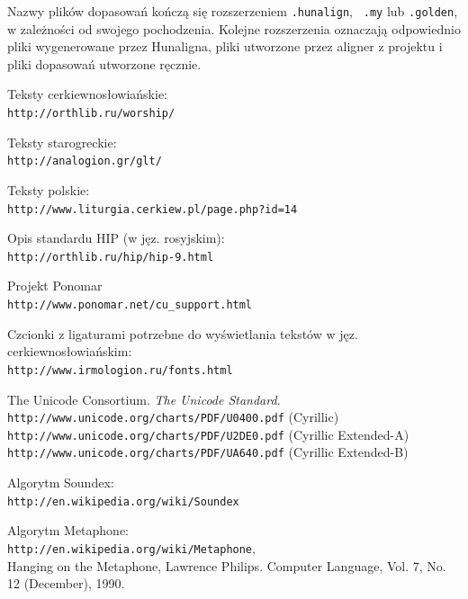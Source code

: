 \documentclass{pracamgr}
\begin{document}
Nazwy plików dopasowań kończą się rozszerzeniem {\tt .hunalign}, {\tt
  .my} lub {\tt .golden}, w zależności od swojego pochodzenia. Kolejne
rozszerzenia oznaczają odpowiednio pliki wygenerowane przez Hunaligna,
pliki utworzone przez aligner z projektu i pliki dopasowań utworzone
ręcznie.


\begin{thebibliography}{99}

 Teksty cerkiewno\-{}słowiańskie:\\
  {\tt http://orthlib.ru/worship/}

 Teksty starogreckie:\\
  {\tt http://analogion.gr/glt/}

 Teksty polskie:\\
  {\tt http://www.liturgia.cerkiew.pl/page.php?id=14}

 Opis standardu HIP (w jęz. rosyjskim):\\
  {\tt http://orthlib.ru/hip/hip-9.html}

 Projekt Ponomar \\
  {\tt http://www.ponomar.net/cu\_support.html}

 Czcionki z ligaturami potrzebne do wyświetlania
  tekstów w jęz. cerkiewno\-{}słowiańskim:\\
  {\tt http://www.irmologion.ru/fonts.html}

  The Unicode Consortium. \textit{The Unicode Standard}.\\
  {\tt http://www.unicode.org/charts/PDF/U0400.pdf} (Cyrillic)\\
  {\tt http://www.unicode.org/charts/PDF/U2DE0.pdf} (Cyrillic Extended-A)\\
  {\tt http://www.unicode.org/charts/PDF/UA640.pdf} (Cyrillic Extended-B)

 Algorytm Soundex:\\
  {\tt http://en.wikipedia.org/wiki/Soundex}

 Algorytm Metaphone:\\
  {\tt http://en.wikipedia.org/wiki/Metaphone},\\
  Hanging on the Metaphone, Lawrence Philips. Computer Language,
  Vol. 7, No. 12 (December), 1990.


\end{thebibliography}
\end{document}
